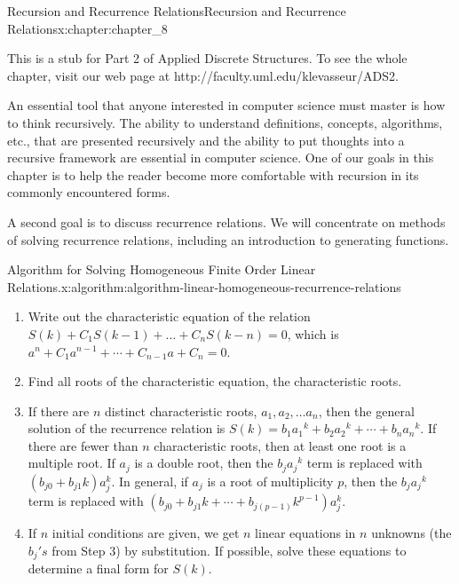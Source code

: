 \documentclass[twoside,10pt,]{book}
\numberwithin{equation}{section}
\begin{document}
%
%
\typeout{************************************************}
\typeout{************************************************}
%
\begin{chapterptx}{Recursion and Recurrence Relations}{}{Recursion and Recurrence Relations}{}{}{x:chapter:chapter_8}
\begin{introduction}{}%
This is a stub for Part 2 of Applied Discrete Structures. To see the whole chapter, visit our web page at http:\slash{}\slash{}faculty.uml.edu\slash{}klevasseur\slash{}ADS2.%
\par
An essential tool that anyone interested in computer science must master is how to think recursively. The ability to understand definitions, concepts, algorithms, etc., that are presented recursively and the ability to put thoughts into a recursive framework are essential in computer science. One of our goals in this chapter is to help the reader become more comfortable with recursion in its commonly encountered forms.%
\par
A second goal is to discuss recurrence relations. We will concentrate on methods of solving recurrence relations, including an introduction to generating functions.%
\end{introduction}%
\begin{algorithm}{Algorithm for Solving Homogeneous Finite Order Linear Relations.}{}{x:algorithm:algorithm-linear-homogeneous-recurrence-relations}%
%
\begin{enumerate}[label=(\alph*)]
\item{}Write out the characteristic equation of the relation \(S(k) + C_1S(k - 1) +\ldots + C_n S(k - n) =0\), which is \(a^n+ C_1a^{n-1}+\cdots
+C_{n-1}a+C_n=0\).%
\item{}Find all roots of the characteristic equation, the characteristic roots.%
\item{}If there are \(n\) distinct characteristic roots, \(a_1, a_2, \dots a_n\), then the general solution of the recurrence relation is \(S(k) = b_1a_1{}^k+ b_2a_2{}^k+\cdots +b_na_n{}^k\). If there are fewer than \(n\) characteristic roots, then at least one root is a multiple root. If \(a_j\) is a double root, then the \(b_ja_j{}^k\) term is replaced with \(\left(b_{j 0}+b_{j 1}k\right)a_j^{k}\textrm{.}\) In general, if \(a_j\) is a root of multiplicity \(p\), then the \(b_ja_j{}^k\) term is replaced with \(\left(b_{j 0}+b_{j 1}k+\cdots +b_{j(p-1)}k^{p-1}\right)a_j^{k}\).%
\item{}If \(n\) initial conditions are given, we get \(n\) linear equations in \(n\) unknowns (the \({b_j}'s\) from Step 3) by substitution. If possible, solve these equations to determine a final form for \(S(k)\).%

\end{enumerate}
\end{algorithm}
\end{chapterptx}
\end{document}
